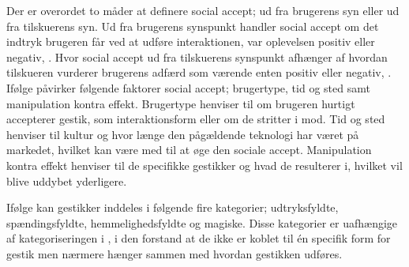 %
Der er overordet to måder at definere social accept; ud fra brugerens syn eller ud fra tilskuerens syn. Ud fra brugerens synspunkt handler social accept om det indtryk brugeren får ved at udføre interaktionen, var oplevelsen positiv eller negativ, \parencite[s. 2]{PDF:WouldYouDoThat}. Hvor social accept ud fra tilskuerens synspunkt afhænger af hvordan tilskueren vurderer brugerens adfærd som værende enten positiv eller negativ, \parencite[s. 2]{PDF:WouldYouDoThat}. Ifølge \textcite[s. 2]{PDF:WouldYouDoThat} påvirker følgende faktorer social accept; brugertype, tid og sted samt manipulation kontra effekt. Brugertype henviser til om brugeren hurtigt accepterer gestik, som interaktionsform eller om de stritter i mod. Tid og sted henviser til kultur og hvor længe den pågældende teknologi har været på markedet, hvilket kan være med til at øge den sociale accept. Manipulation kontra effekt henviser til de specifikke gestikker og hvad de resulterer i, hvilket vil blive uddybet yderligere.

Ifølge \textcite[s. 2]{PDF:WouldYouDoThat} kan gestikker inddeles i følgende fire kategorier; udtryksfyldte, spændingsfyldte, hemmelighedsfyldte og magiske. Disse kategorier er uafhængige af kategoriseringen i , i den forstand at de ikke er koblet til én specifik form for gestik men nærmere hænger sammen med hvordan gestikken udføres.

       










